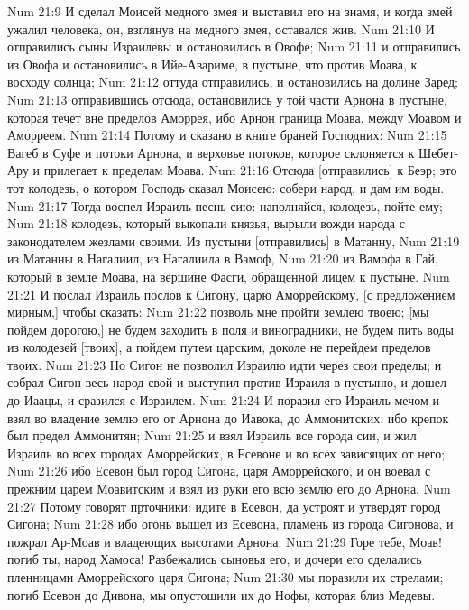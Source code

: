 \vs Num 21:9 И сделал Моисей медного змея и выставил его на знамя, и когда змей ужалил человека, он, взглянув на медного змея, оставался жив.
\rsbpar\vs Num 21:10 И отправились сыны Израилевы и остановились в Овофе;
\vs Num 21:11 и отправились из Овофа и остановились в Ийе-Авариме, в пустыне, что против Моава, к восходу солнца;
\vs Num 21:12 оттуда отправились, и остановились на долине Заред;
\vs Num 21:13 отправившись отсюда, остановились у той части Арнона в пустыне, которая течет вне пределов Аморрея, ибо Арнон граница Моава, между Моавом и Аморреем.
\vs Num 21:14 Потому и сказано в книге браней Господних:
\vs Num 21:15 Вагеб в Суфе и потоки Арнона, и верховье потоков, которое склоняется к Шебет-Ару и прилегает к пределам Моава.
\vs Num 21:16 Отсюда [отправились] к Беэр; это тот колодезь, о котором Господь сказал Моисею: собери народ, и дам им воды.
\vs Num 21:17 Тогда воспел Израиль песнь сию: наполняйся, колодезь, пойте ему;
\vs Num 21:18 колодезь, который выкопали князья, вырыли вожди народа с законодателем жезлами своими. Из пустыни [отправились] в Матанну,
\vs Num 21:19 из Матанны в Нагалиил, из Нагалиила в Вамоф,
\vs Num 21:20 из Вамофа в Гай, который в земле Моава, на вершине  Фасги, обращенной лицем к пустыне.
\vs Num 21:21 И послал Израиль послов к Сигону, царю Аморрейскому, [с предложением мирным,] чтобы сказать:
\vs Num 21:22 позволь мне пройти землею твоею; [мы пойдем дорогою,] не будем заходить в поля и виноградники, не будем пить воды из колодезей [твоих], а пойдем путем царским, доколе не перейдем пределов твоих.
\vs Num 21:23 Но Сигон не позволил Израилю идти через свои пределы; и собрал Сигон весь народ свой и выступил против Израиля в пустыню, и дошел до Иаацы, и сразился с Израилем.
\vs Num 21:24 И поразил его Израиль мечом и взял во владение землю его от Арнона до Иавока, до  Аммонитских, ибо крепок был предел Аммонитян;
\vs Num 21:25 и взял Израиль все города сии, и жил Израиль во всех городах Аморрейских, в Есевоне и во всех зависящих от него;
\vs Num 21:26 ибо Есевон был город Сигона, царя Аморрейского, и он воевал с прежним царем Моавитским и взял из руки его всю землю его до Арнона.
\vs Num 21:27 Потому говорят прточники: идите в Есевон, да устроят и утвердят город Сигона;
\vs Num 21:28 ибо огонь вышел из Есевона, пламень из города Сигонова, и пожрал Ар-Моав и владеющих высотами Арнона.
\vs Num 21:29 Горе тебе, Моав! погиб ты, народ Хамоса! Разбежались сыновья его, и дочери его сделались пленницами Аморрейского царя Сигона;
\vs Num 21:30 мы поразили их стрелами; погиб Есевон до Дивона, мы опустошили их до Нофы, которая близ Медевы.
